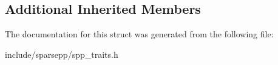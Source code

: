 \subsection*{Additional Inherited Members}


The documentation for this struct was generated from the following file\+:\begin{DoxyCompactItemize}
\item 
include/sparsepp/spp\+\_\+traits.\+h\end{DoxyCompactItemize}
